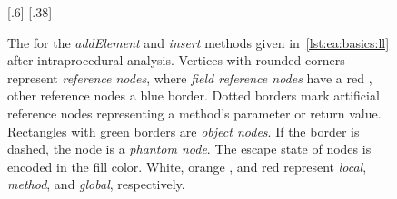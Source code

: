 			\begin{figure}
				\centering%
				[.6\textwidth]{%
						\centering%
				}%
				\hspace{\fill}%
				{%
						\centering%
				}%
				\caption[The  for \emph{addElement} and \emph{insert} after intraprocedural analysis]{%
					The  for the \emph{addElement} and \emph{insert} methods given in~\cref{lst:ea:basics:ll} after
					intraprocedural analysis. Vertices with rounded corners represent \emph{reference nodes}, where \emph{field
					reference nodes} have a red {\color{cgred}\blacksquare}, other reference nodes a blue
					{\color{cgblue}\blacksquare} border. Dotted borders mark artificial reference nodes representing a method's
					parameter or return value. Rectangles with green {\color{cggreen}\blacksquare} borders are \emph{object
					nodes}. If the border is dashed, the node is a \emph{phantom node}. The escape state of nodes is encoded in
					the fill color. White, orange {\color{cgorange}\blacksquare}, and red {\color{cgwarn}\blacksquare} represent
					\emph{local}, \emph{method}, and \emph{global}, respectively.}%
				\label{fig:ea:basics:ll}%
			\end{figure}

